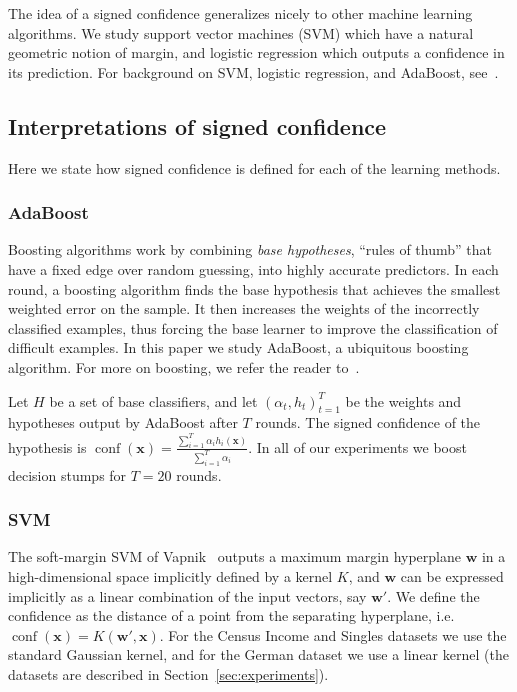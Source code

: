 \documentclass[twoside,leqno,twocolumn]{article}
\DeclareMathOperator{\conf}{conf}
\begin{document}
The idea of a signed confidence generalizes nicely to other machine
learning algorithms. We study support vector machines (SVM) which have a
natural geometric notion of margin, and logistic regression which outputs a
confidence in its prediction. For background on SVM, logistic regression, and
AdaBoost, see~\cite{ShalevShwartzBD14}.


\subsection{Interpretations of signed confidence}
Here we state how signed confidence is defined for each of the learning
methods.

\subsubsection{AdaBoost}
Boosting algorithms work by combining \emph{base hypotheses}, ``rules of
thumb'' that have a fixed edge over random guessing, into highly accurate
predictors.  In each round, a boosting algorithm finds the base hypothesis that
achieves the smallest weighted error on the sample. It then increases the
weights of the incorrectly classified examples, thus forcing the base learner
to improve the classification of difficult examples. In this paper we study
AdaBoost, a ubiquitous boosting algorithm. For more on boosting, we refer the
reader to~\cite{SchapireF12}. 

Let $H$ be a set of base classifiers, and let $(\alpha_t, h_t)_{t=1}^T$ be the
weights and hypotheses output by AdaBoost after $T$ rounds.  The signed
confidence of the hypothesis is $\conf(\mathbf x) = \frac{\sum_{i=1}^T \alpha_i
h_i(\mathbf x)}{\sum_{i=1}^T \alpha_i}.$ In all of our experiments we boost
decision stumps for $T=20$ rounds.

\subsubsection{SVM} The soft-margin SVM of Vapnik~\cite{CortesV95} outputs a
maximum margin hyperplane $\mathbf{w}$ in a high-dimensional space implicitly
defined by a kernel $K$, and $\mathbf{w}$ can be expressed implicitly as a
linear combination of the input vectors, say $\mathbf{w'}$.  We define the
confidence as the distance of a point from the separating hyperplane, i.e.
$\conf(\mathbf x) = K (\mathbf{w'}, \mathbf x)$. For the Census Income and
Singles datasets we use the standard Gaussian kernel, and for the German
dataset we use a linear kernel (the datasets are described in
Section~\ref{sec:experiments}). 
\end{document}
